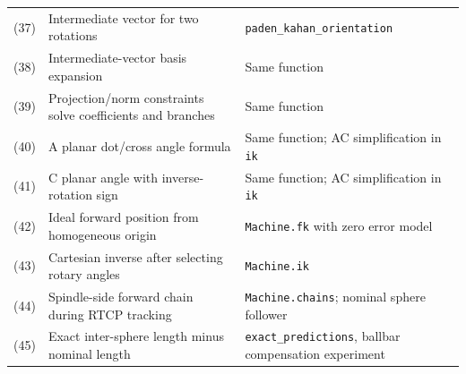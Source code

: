 {\begin{longtable}{p{.11\linewidth}p{.42\linewidth}p{.37\linewidth}}
(37) & Intermediate vector for two rotations & \texttt{paden\_kahan\_orientation} \\
(38) & Intermediate-vector basis expansion & Same function \\
(39) & Projection/norm constraints solve coefficients and branches & Same function \\
(40) & A planar dot/cross angle formula & Same function; AC simplification in \texttt{ik} \\
(41) & C planar angle with inverse-rotation sign & Same function; AC simplification in \texttt{ik} \\
(42) & Ideal forward position from homogeneous origin & \texttt{Machine.fk} with zero error model \\
(43) & Cartesian inverse after selecting rotary angles & \texttt{Machine.ik} \\
(44) & Spindle-side forward chain during RTCP tracking & \texttt{Machine.chains}; nominal sphere follower \\
(45) & Exact inter-sphere length minus nominal length & \texttt{exact\_predictions}, ballbar compensation experiment \\
\bottomrule
\end{longtable}}